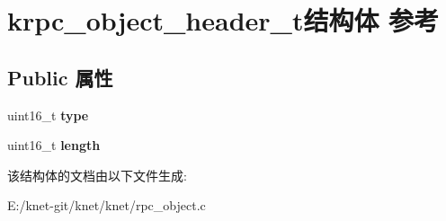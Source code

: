 \hypertarget{structkrpc__object__header__t}{}\section{krpc\+\_\+object\+\_\+header\+\_\+t结构体 参考}
\label{structkrpc__object__header__t}
\subsection*{Public 属性}
\begin{DoxyCompactItemize}
\item 
\hypertarget{structkrpc__object__header__t_a6046764f8c600114919e7d739037b502}{}uint16\+\_\+t {\bfseries type}\label{structkrpc__object__header__t_a6046764f8c600114919e7d739037b502}

\item 
\hypertarget{structkrpc__object__header__t_a41472aba96fe4aece7d7afce5405e515}{}uint16\+\_\+t {\bfseries length}\label{structkrpc__object__header__t_a41472aba96fe4aece7d7afce5405e515}

\end{DoxyCompactItemize}


该结构体的文档由以下文件生成\+:\begin{DoxyCompactItemize}
\item 
E\+:/knet-\/git/knet/knet/rpc\+\_\+object.\+c\end{DoxyCompactItemize}
